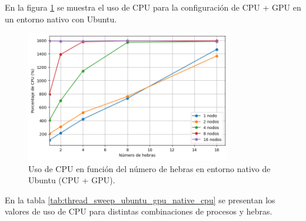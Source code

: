 En la figura \ref{fig:thread_sweep_ubuntu_gpu_native_cpu} se muestra el uso de CPU para la configuración de CPU + GPU en un entorno nativo con Ubuntu.

\begin{figure}[H]
    \centering
    \includegraphics[width=0.8\textwidth]{imagenes/cap5/thread_sweep_ubuntu_gpu_native_cpu.png}
    \caption{Uso de CPU en función del número de hebras en entorno nativo de Ubuntu (CPU + GPU).}
    \label{fig:thread_sweep_ubuntu_gpu_native_cpu}
\end{figure}

En la tabla \ref{tab:thread_sweep_ubuntu_gpu_native_cpu} se presentan los valores de uso de CPU para distintas combinaciones de procesos y hebras.

